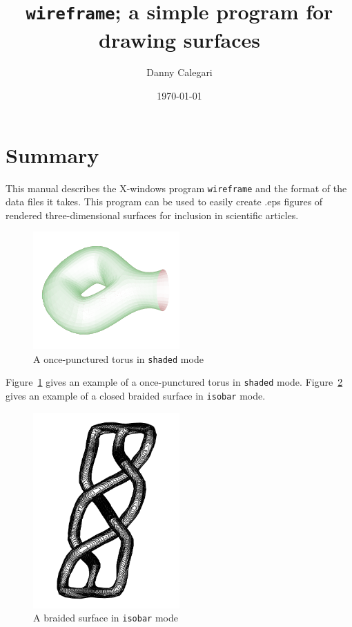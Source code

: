 \documentclass[12pt]{article}
\begin{document}
\title{{\tt wireframe}; a simple program for drawing surfaces}

\author{Danny Calegari}
\date{\today}



\maketitle
\setcounter{tocdepth}{1}
\tableofcontents

\section{Summary}
This manual describes the X-windows program {\tt wireframe} and the format of the data files it takes.
This program can be used to easily create .eps figures of rendered three-dimensional surfaces
for inclusion in scientific articles.

\begin{figure}[ht]
  \caption{A once-punctured torus in {\tt shaded} mode}\label{punct}
  \centering
    \includegraphics[width=0.5\textwidth]{punct}
\end{figure}

Figure~\ref{punct}
gives an example of a once-punctured torus in {\tt shaded} mode.
Figure~\ref{braid_iso} gives an example of a closed braided surface in {\tt isobar} mode. 

\begin{figure}[ht]
  \caption{A braided surface in {\tt isobar} mode}\label{braid_iso}
  \centering
    \includegraphics[width=0.5\textwidth]{braid_iso}
\end{figure}
\end{document}
